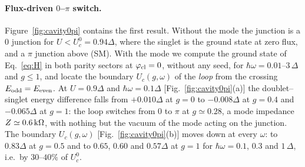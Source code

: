 \paragraph*{Flux-driven $0$--$\pi$ switch.}
Figure~\ref{fig:cavity0pi} contains the first result. Without the mode the junction is a $0$ junction for
$U<U_c^0=0.94\Delta$, where the singlet is the ground state at zero flux, and a $\pi$ junction above (SM).
With the mode we compute the ground state of Eq.~\eqref{eq:H} in both parity sectors at $\varphi_{\rm cl}=0$,
without any seed, for $\hbar\omega=0.01$--$3\,\Delta$ and $g\le1$, and locate the boundary $U_c(g,\omega)$ of
the \emph{loop} from the crossing $E_{\rm odd}=E_{\rm even}$. At $U=0.9\Delta$ and $\hbar\omega=0.1\Delta$
[Fig.~\ref{fig:cavity0pi}(a)] the doublet--singlet energy difference falls from $+0.010\Delta$ at $g=0$ to
$-0.008\Delta$ at $g=0.4$ and $-0.065\Delta$ at $g=1$: the loop switches from $0$ to $\pi$ at $g\simeq0.28$,
a mode impedance $Z\simeq0.6\,{\rm k}\Omega$, with nothing but the vacuum of the mode acting on the junction.
The boundary $U_c(g,\omega)$ [Fig.~\ref{fig:cavity0pi}(b)] moves down at every $\omega$: to $0.83\Delta$ at
$g=0.5$ and to $0.65$, $0.60$ and $0.57\Delta$ at $g=1$ for $\hbar\omega=0.1$, $0.3$ and $1\,\Delta$, i.e.\ by
$30$--$40\%$ of $U_c^0$.

